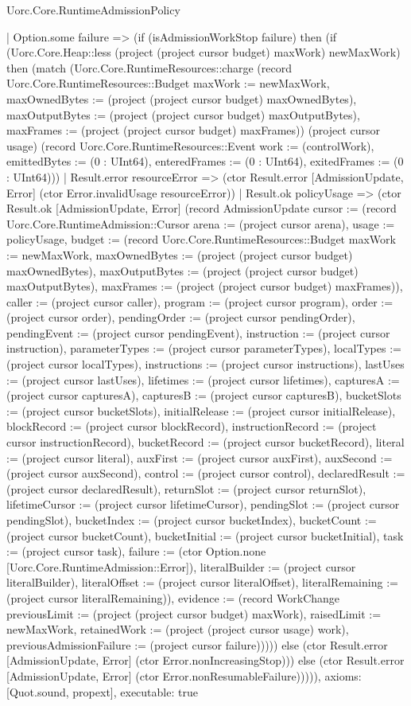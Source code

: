 \begin{lexlean}{Uorc.Core.RuntimeAdmissionPolicy}
\begin{semanticmodule}
{    | Option.some failure => (if (isAdmissionWorkStop failure) then (if (Uorc.Core.Heap::less (project (project cursor budget) maxWork) newMaxWork) then (match (Uorc.Core.RuntimeResources::charge (record Uorc.Core.RuntimeResources::Budget {maxWork := newMaxWork, maxOwnedBytes := (project (project cursor budget) maxOwnedBytes), maxOutputBytes := (project (project cursor budget) maxOutputBytes), maxFrames := (project (project cursor budget) maxFrames)}) (project cursor usage) (record Uorc.Core.RuntimeResources::Event {work := (controlWork), emittedBytes := (0 : UInt64), enteredFrames := (0 : UInt64), exitedFrames := (0 : UInt64)}))
      | Result.error resourceError => (ctor Result.error [AdmissionUpdate, Error] (ctor Error.invalidUsage resourceError))
      | Result.ok policyUsage => (ctor Result.ok [AdmissionUpdate, Error] (record AdmissionUpdate {cursor := (record Uorc.Core.RuntimeAdmission::Cursor {arena := (project cursor arena), usage := policyUsage, budget := (record Uorc.Core.RuntimeResources::Budget {maxWork := newMaxWork, maxOwnedBytes := (project (project cursor budget) maxOwnedBytes), maxOutputBytes := (project (project cursor budget) maxOutputBytes), maxFrames := (project (project cursor budget) maxFrames)}), caller := (project cursor caller), program := (project cursor program), order := (project cursor order), pendingOrder := (project cursor pendingOrder), pendingEvent := (project cursor pendingEvent), instruction := (project cursor instruction), parameterTypes := (project cursor parameterTypes), localTypes := (project cursor localTypes), instructions := (project cursor instructions), lastUses := (project cursor lastUses), lifetimes := (project cursor lifetimes), capturesA := (project cursor capturesA), capturesB := (project cursor capturesB), bucketSlots := (project cursor bucketSlots), initialRelease := (project cursor initialRelease), blockRecord := (project cursor blockRecord), instructionRecord := (project cursor instructionRecord), bucketRecord := (project cursor bucketRecord), literal := (project cursor literal), auxFirst := (project cursor auxFirst), auxSecond := (project cursor auxSecond), control := (project cursor control), declaredResult := (project cursor declaredResult), returnSlot := (project cursor returnSlot), lifetimeCursor := (project cursor lifetimeCursor), pendingSlot := (project cursor pendingSlot), bucketIndex := (project cursor bucketIndex), bucketCount := (project cursor bucketCount), bucketInitial := (project cursor bucketInitial), task := (project cursor task), failure := (ctor Option.none [Uorc.Core.RuntimeAdmission::Error]), literalBuilder := (project cursor literalBuilder), literalOffset := (project cursor literalOffset), literalRemaining := (project cursor literalRemaining)}), evidence := (record WorkChange {previousLimit := (project (project cursor budget) maxWork), raisedLimit := newMaxWork, retainedWork := (project (project cursor usage) work), previousAdmissionFailure := (project cursor failure)})}))) else (ctor Result.error [AdmissionUpdate, Error] (ctor Error.nonIncreasingStop))) else (ctor Result.error [AdmissionUpdate, Error] (ctor Error.nonResumableFailure))))),
  axioms: [Quot.sound, propext],
  executable: true
}


\end{semanticmodule}
\end{lexlean}
